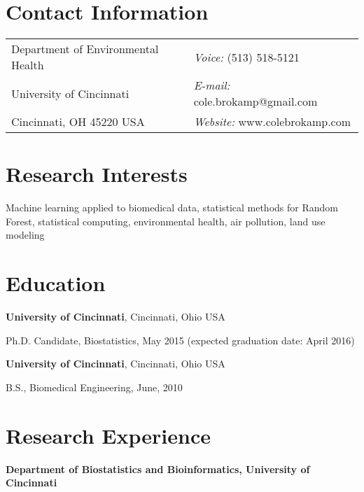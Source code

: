 \documentclass[margin,line]{res}
\newenvironment{list1}{
  \begin{list}{\ding{113}}{%
      \setlength{\itemsep}{0in}
      \setlength{\parsep}{0in} \setlength{\parskip}{0in}
      \setlength{\topsep}{0in} \setlength{\partopsep}{0in} 
      \setlength{\leftmargin}{0.17in}}}{\end{list}}
\begin{document}

\begin{resume}
\section{\sc Contact Information}
\vspace{.05in}
\begin{tabular}{@{}p{3in}p{4in}}      
Department of Environmental Health  & {\it Voice:}  (513) 518-5121 \\         
University of Cincinnati & {\it E-mail:}  cole.brokamp@gmail.com\\       
Cincinnati, OH 45220 USA  & {\it Website:} www.colebrokamp.com \\     
\end{tabular}


\section{\sc Research Interests}
Machine learning applied to biomedical data, statistical methods for Random Forest,
statistical computing, environmental health, air pollution, land use modeling

\section{\sc Education}
{\bf University of Cincinnati}, Cincinnati, Ohio USA \\
\vspace*{-.1in}
\begin{list1}
\item[]Ph.D. Candidate, Biostatistics, May 2015 (expected
  graduation date: April 2016)
\end{list1}

{\bf University of Cincinnati}, Cincinnati, Ohio USA\\
\vspace*{-.1in}
\begin{list1}
\item[]B.S., Biomedical Engineering,  June, 2010
\end{list1}


\section{\sc Research Experience}
\textbf{Department of Biostatistics and Bioinformatics, University of Cincinnati} \\


\end{resume}
\end{document}
